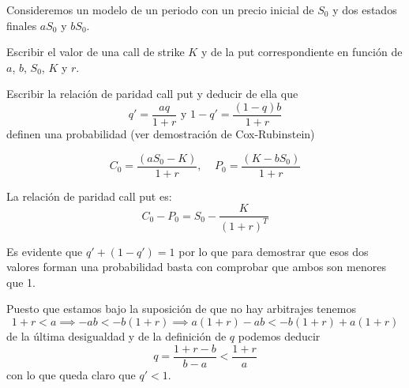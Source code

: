 \begin{problem}[8]
Consideremos un modelo de un periodo con un precio inicial de $S_0$ y dos estados finales $aS_0$ y $bS_0$.

\ppart Escribir el valor de una call de strike $K$ y de la put correspondiente en función de $a$, $b$, $S_0$, $K$ y $r$.

\ppart
Escribir la relación de paridad call put y deducir de ella que
\[q' =\frac{aq}{1+r} \text{ y } 1-q'=\frac{(1-q)b}{1+r}\]
definen una probabilidad (ver demostración de Cox-Rubinstein)

\solution
{}

\spart
\[C_0 = \frac{(aS_0-K)}{1+r}, \;\;\;\; P_0 = \frac{(K-bS_0)}{1+r}\]

\spart

La relación de paridad call put es:
\[C_0 - P_0 = S_0-\frac{K}{(1+r)^T}\]

Es evidente que $q'+(1-q')=1$ por lo que para demostrar que esos dos valores forman una probabilidad basta con comprobar que ambos son menores que 1.

Puesto que estamos bajo la suposición de que no hay arbitrajes tenemos
\[1+r < a \implies -ab < -b(1+r) \implies a(1+r)-ab < -b(1+r)+a(1+r)\]
de la última desigualdad y de la definición de $q$ podemos deducir
\[q=\frac{1+r-b}{b-a} < \frac{1+r}{a}\]
con lo que queda claro que $q'<1$.
\end{problem}